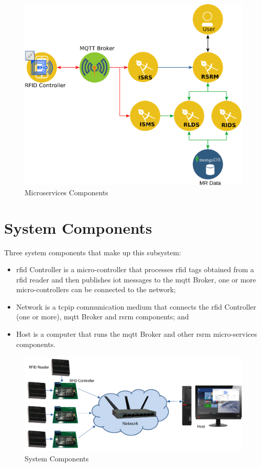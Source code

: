\begin{figure}[H]
	\centering
		\includegraphics[scale=0.7]{rsms_design.eps}
	\caption{Microservices Components}
	\label{fig:rsms-ms-components}
\end{figure}

\section{System Components}
Three system components that make up this subsystem:
\begin{itemize}
\item \gls{rfid} Controller is a micro-controller that processes \gls{rfid} tags obtained from a \gls{rfid} reader and then publishes \gls{iot} messages to the \gls{mqtt} Broker, one or more micro-controllers can be connected to the network;
\item Network is a \gls{tcpip} communication medium that connects the \gls{rfid} Controller (one or more), \gls{mqtt} Broker and \gls{rsrm} components; and
\item Host is a computer that runs the \gls{mqtt} Broker and other \gls{rsrm} micro-services components.
\end{itemize}

\begin{figure}[H]
	\centering
		\includegraphics[scale=0.7]{rsms_system.eps}
	\caption{System Components}
	\label{fig:rsms-system-components}
\end{figure}

